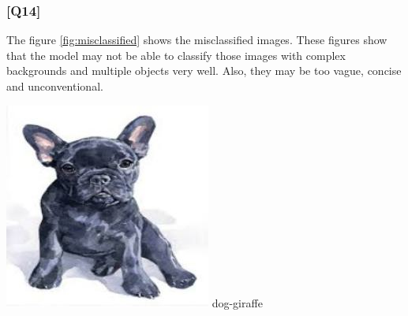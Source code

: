 \documentclass{article}
\begin{document}
\subsubsection*{[Q14]}

The figure \ref{fig:misclassified} shows the misclassified images.
These figures show that the model may not be able to classify those images with complex backgrounds and multiple objects very well.
Also, they may be too vague, concise and unconventional.

\begin{center}
    \noindent 
    \begin{minipage}{0.142\textwidth}
        \includegraphics[width=\linewidth]{./pic/misclassified_r0_p2_2723.jpg}
        dog-giraffe
    \end{minipage}%
    \begin{minipage}{0.142\textwidth}

\end{minipage}
\end{center}
\end{document}
